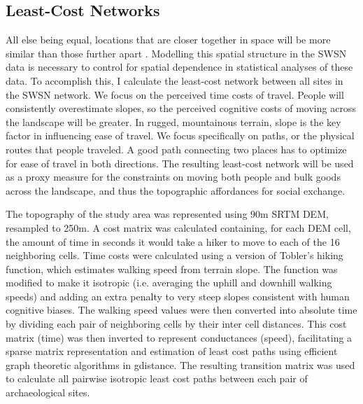 \documentclass[10pt]{iopart}
\begin{document}
\subsection*{Least-Cost Networks}
All else being equal, locations that are closer together in space will be more similar than those further apart \parencite{Tobler1970}. Modelling this spatial structure in the SWSN data is necessary to control for spatial dependence in statistical analyses of these data. To accomplish this, I calculate the least-cost network between all sites in the SWSN network. We focus on the perceived time costs of travel. People will consistently overestimate slopes, so the perceived cognitive costs of moving across the landscape will be greater. In rugged, mountainous terrain, slope is the key factor in influencing ease of travel. We focus specifically on paths, or the physical routes that people traveled. A good path connecting two places has to optimize for ease of travel in both directions. The resulting least-cost network will be used as a proxy measure for the constraints on moving both people and bulk goods across the landscape, and thus the topographic affordances for social exchange.

The topography of the study area was represented using 90m SRTM DEM, resampled to 250m. A cost matrix was calculated containing, for each DEM cell, the amount of time in seconds it would take a hiker to move to each of the 16 neighboring cells. Time costs were calculated using a version of Tobler's hiking function, which estimates walking speed from terrain slope. The function was modified to make it isotropic (i.e. averaging the uphill and downhill walking speeds) and adding an extra penalty to very steep slopes consistent with human cognitive biases. The walking speed values were then converted into absolute time by dividing each pair of neighboring cells by their inter cell distances. This cost matrix (time) was then inverted to represent conductances (speed), facilitating a sparse matrix representation and estimation of least cost paths using efficient graph theoretic algorithms in gdistance. The resulting transition matrix was used to calculate all pairwise isotropic least cost paths between each pair of archaeological sites. 
\end{document}
